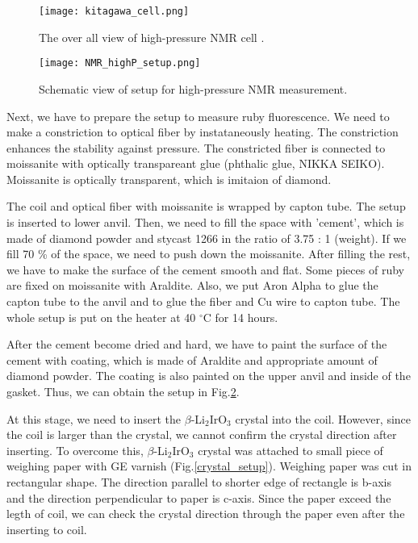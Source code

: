 \begin{figure}[H]
  \centering
  \texttt{[image: kitagawa\_cell.png]}
  \caption{The over all view of high-pressure NMR cell \cite{Kitagawa2010}.}
  \label{kitagawa_cell}
\end{figure}

\begin{figure}
  \centering
  \texttt{[image: NMR\_highP\_setup.png]}
  \caption{Schematic view of setup for high-pressure NMR measurement.}
  \label{NMR_highP_setup}
\end{figure}

Next, we have to prepare the setup to measure ruby fluorescence.
We need to make a constriction to optical fiber by instataneously heating.
The constriction enhances the stability against pressure.
The constricted fiber is connected to moissanite with optically transpareant glue (phthalic glue, NIKKA SEIKO).
Moissanite is optically transparent, which is imitaion of diamond.

The coil and optical fiber with moissanite is wrapped by capton tube.
The setup is inserted to lower anvil.
Then, we need to fill the space with 'cement', which is made of diamond powder and stycast 1266 in the ratio of 3.75 : 1 (weight).
If we fill 70 \% of the space, we need to push down the moissanite.
After filling the rest, we have to make the surface of the cement smooth and flat.
Some pieces of ruby are fixed on moissanite with Araldite.
Also, we put Aron Alpha to glue the capton tube to the anvil and to glue the fiber and Cu wire to capton tube.
The whole setup is put on the heater at 40 ${}^\circ$C for 14 hours.

After the cement become dried and hard, we have to paint the surface of the cement with coating, which is made of Araldite and appropriate amount of diamond powder.
The coating is also painted on the upper anvil and inside of the gasket.
Thus, we can obtain the setup in Fig.\ref{NMR_highP_setup}.

At this stage, we need to insert the $\beta$-Li$_2$IrO$_3$ crystal into the coil.
However, since the coil is larger than the crystal, we cannot confirm the crystal direction after inserting.
To overcome this, $\beta$-Li$_2$IrO$_3$ crystal was attached to small piece of weighing paper with GE varnish (Fig.\ref{crystal_setup}).
Weighing paper was cut in rectangular shape.
The direction parallel to shorter edge of rectangle is b-axis and the direction perpendicular to paper is c-axis.
Since the paper exceed the legth of coil, we can check the crystal direction through the paper even after the inserting to coil.

